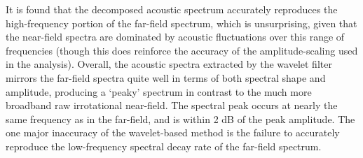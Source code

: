It is found that the decomposed acoustic spectrum accurately reproduces the high-frequency portion of the far-field spectrum, which is unsurprising, given that the near-field spectra are dominated by acoustic fluctuations over this range of frequencies (though this does reinforce the accuracy of the amplitude-scaling used in the analysis).
Overall, the acoustic spectra extracted by the wavelet filter mirrors the far-field spectra quite well in terms of both spectral shape and amplitude, producing a `peaky' spectrum in contrast to the much more broadband raw irrotational near-field. 
The spectral peak occurs at nearly the same frequency as in the far-field, and is within 2 dB of the peak amplitude. 
The one major inaccuracy of the wavelet-based method is the failure to accurately reproduce the low-frequency spectral decay rate of the far-field spectrum. 
